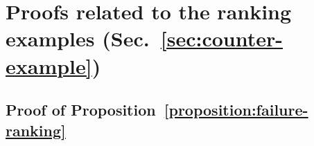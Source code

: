 \documentclass[11pt]{article}
\begin{document}


\appendix

\section{Proofs related to the ranking examples
  (Sec.~\ref{sec:counter-example})}
\label{sec:proofs-counter-example}

\subsection{Proof of Proposition~\ref{proposition:failure-ranking}}
\label{proof:failure-ranking}
\end{document}
